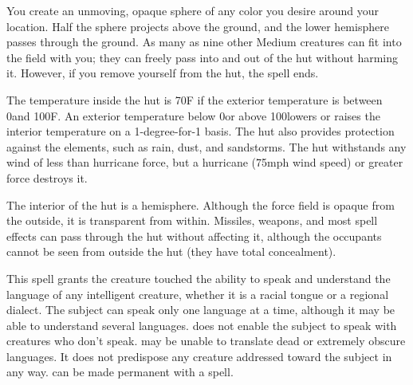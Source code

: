\spelldur{\durext \dismissable}
\spelleffect You create an unmoving, opaque sphere of any color you desire around your location. Half the sphere projects above the ground, and the lower hemisphere passes through the ground. As many as nine other Medium creatures can fit into the field with you; they can freely pass into and out of the hut without harming it. However, if you remove yourself from the hut, the spell ends.
\par The temperature inside the hut is 70\degree F if the exterior temperature is between 0\degree and 100\degree F. An exterior temperature below 0\degree or above 100\degree lowers or raises the interior temperature on a 1-degree-for-1 basis. The hut also provides protection against the elements, such as rain, dust, and sandstorms. The hut withstands any wind of less than hurricane force, but a hurricane (75\add mph wind speed) or greater force destroys it.
\par The interior of the hut is a hemisphere. Although the force field is opaque from the outside, it is transparent from within. Missiles, weapons, and most spell effects can pass through the hut without affecting it, although the occupants cannot be seen from outside the hut (they have total concealment).

\spelldur{\durlong}
\spelleffect This spell grants the creature touched the ability to speak and understand the language of any intelligent creature, whether it is a racial tongue or a regional dialect. The subject can speak only one language at a time, although it may be able to understand several languages.  does not enable the subject to speak with creatures who don't speak.
\spellnotes {} may be unable to translate dead or extremely obscure languages. It does not predispose any creature addressed toward the subject in any way.  can be made permanent with a  spell.

